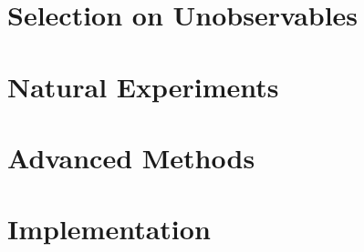 \documentclass[11pt,oneside]{amsbook}
\theoremstyle{definition}
\theoremstyle{plain}
\theoremstyle{remark}
\begin{document}
\part{Selection on Unobservables}
\label{part:selection_unobservables}







\part{Natural Experiments}
\label{part:natural_experiments}








\part{Advanced Methods}
\label{part:advanced_methods}








\part{Implementation}
\label{part:implementation}
\end{document}
